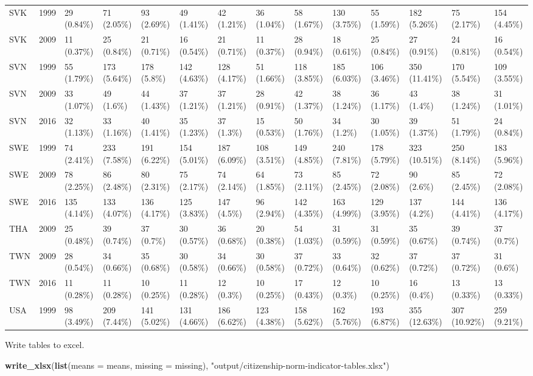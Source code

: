 \documentclass[]{article}
\newenvironment{Shaded}{\begin{snugshade}}{\end{snugshade}}
\newcommand{\DataTypeTok}[1]{\textcolor[rgb]{0.13,0.29,0.53}{#1}}
\newcommand{\KeywordTok}[1]{\textcolor[rgb]{0.13,0.29,0.53}{\textbf{#1}}}
\newcommand{\NormalTok}[1]{#1}
\newcommand{\StringTok}[1]{\textcolor[rgb]{0.31,0.60,0.02}{#1}}
\begin{document}
\begin{longtable}[]{@{}lrllllllllllll@{}}
SVK & 1999 & 29 (0.84\%) & 71 (2.05\%) & 93 (2.69\%) & 49 (1.41\%) & 42
(1.21\%) & 36 (1.04\%) & 58 (1.67\%) & 130 (3.75\%) & 55 (1.59\%) & 182
(5.26\%) & 75 (2.17\%) & 154 (4.45\%)\tabularnewline
SVK & 2009 & 11 (0.37\%) & 25 (0.84\%) & 21 (0.71\%) & 16 (0.54\%) & 21
(0.71\%) & 11 (0.37\%) & 28 (0.94\%) & 18 (0.61\%) & 25 (0.84\%) & 27
(0.91\%) & 24 (0.81\%) & 16 (0.54\%)\tabularnewline
SVN & 1999 & 55 (1.79\%) & 173 (5.64\%) & 178 (5.8\%) & 142 (4.63\%) &
128 (4.17\%) & 51 (1.66\%) & 118 (3.85\%) & 185 (6.03\%) & 106 (3.46\%)
& 350 (11.41\%) & 170 (5.54\%) & 109 (3.55\%)\tabularnewline
SVN & 2009 & 33 (1.07\%) & 49 (1.6\%) & 44 (1.43\%) & 37 (1.21\%) & 37
(1.21\%) & 28 (0.91\%) & 42 (1.37\%) & 38 (1.24\%) & 36 (1.17\%) & 43
(1.4\%) & 38 (1.24\%) & 31 (1.01\%)\tabularnewline
SVN & 2016 & 32 (1.13\%) & 33 (1.16\%) & 40 (1.41\%) & 35 (1.23\%) & 37
(1.3\%) & 15 (0.53\%) & 50 (1.76\%) & 34 (1.2\%) & 30 (1.05\%) & 39
(1.37\%) & 51 (1.79\%) & 24 (0.84\%)\tabularnewline
SWE & 1999 & 74 (2.41\%) & 233 (7.58\%) & 191 (6.22\%) & 154 (5.01\%) &
187 (6.09\%) & 108 (3.51\%) & 149 (4.85\%) & 240 (7.81\%) & 178 (5.79\%)
& 323 (10.51\%) & 250 (8.14\%) & 183 (5.96\%)\tabularnewline
SWE & 2009 & 78 (2.25\%) & 86 (2.48\%) & 80 (2.31\%) & 75 (2.17\%) & 74
(2.14\%) & 64 (1.85\%) & 73 (2.11\%) & 85 (2.45\%) & 72 (2.08\%) & 90
(2.6\%) & 85 (2.45\%) & 72 (2.08\%)\tabularnewline
SWE & 2016 & 135 (4.14\%) & 133 (4.07\%) & 136 (4.17\%) & 125 (3.83\%) &
147 (4.5\%) & 96 (2.94\%) & 142 (4.35\%) & 163 (4.99\%) & 129 (3.95\%) &
137 (4.2\%) & 144 (4.41\%) & 136 (4.17\%)\tabularnewline
THA & 2009 & 25 (0.48\%) & 39 (0.74\%) & 37 (0.7\%) & 30 (0.57\%) & 36
(0.68\%) & 20 (0.38\%) & 54 (1.03\%) & 31 (0.59\%) & 31 (0.59\%) & 35
(0.67\%) & 39 (0.74\%) & 37 (0.7\%)\tabularnewline
TWN & 2009 & 28 (0.54\%) & 34 (0.66\%) & 35 (0.68\%) & 30 (0.58\%) & 34
(0.66\%) & 30 (0.58\%) & 37 (0.72\%) & 33 (0.64\%) & 32 (0.62\%) & 37
(0.72\%) & 37 (0.72\%) & 31 (0.6\%)\tabularnewline
TWN & 2016 & 11 (0.28\%) & 11 (0.28\%) & 10 (0.25\%) & 11 (0.28\%) & 12
(0.3\%) & 10 (0.25\%) & 17 (0.43\%) & 12 (0.3\%) & 10 (0.25\%) & 16
(0.4\%) & 13 (0.33\%) & 13 (0.33\%)\tabularnewline
USA & 1999 & 98 (3.49\%) & 209 (7.44\%) & 141 (5.02\%) & 131 (4.66\%) &
186 (6.62\%) & 123 (4.38\%) & 158 (5.62\%) & 162 (5.76\%) & 193 (6.87\%)
& 355 (12.63\%) & 307 (10.92\%) & 259 (9.21\%)\tabularnewline
\bottomrule
\end{longtable}

Write tables to excel.

\begin{Shaded}
\begin{Highlighting}[]
\KeywordTok{write_xlsx}\NormalTok{(}\KeywordTok{list}\NormalTok{(}\DataTypeTok{means =}\NormalTok{ means, }\DataTypeTok{missing =}\NormalTok{ missing), }\StringTok{"output/citizenship-norm-indicator-tables.xlsx"}\NormalTok{)}
\end{Highlighting}
\end{Shaded}
\end{document}
